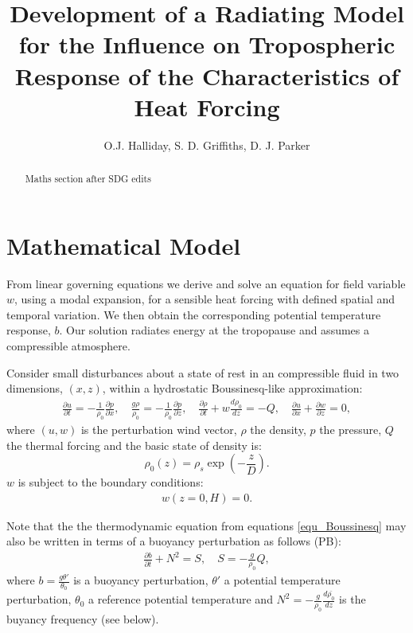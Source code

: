 \documentclass[a4paper,10pt]{article}
\title{Development of a Radiating Model for the Influence on Tropospheric Response of the Characteristics of Heat Forcing }
\author{O.J. Halliday, S. D. Griffiths, D. J. Parker}
\begin{document}
\maketitle
\begin{abstract}
Maths section after SDG edits
\end{abstract}

\section{Mathematical Model}
\label{sec_Model}
%
From linear governing equations we derive and solve an equation for field variable $w$, 
using a modal expansion, for a sensible heat forcing with defined spatial and temporal variation.
We then obtain the corresponding potential temperature response, $b$. 
Our solution radiates energy at the tropopause and assumes a compressible atmosphere.

Consider small disturbances about a state of rest in an compressible fluid in two dimensions, $(x, z)$,
within a hydrostatic Boussinesq-like approximation:
%
\begin{eqnarray}
\label{equ_Boussinesq}
\frac{\partial u}{\partial t}  = - \frac{1}{\rho_0} \frac{\partial p}{\partial x}, \quad
\frac{g \rho}{\rho_0}  =  - \frac{1}{\rho_0}  \frac{\partial p}{\partial z}, \quad
\frac{\partial \rho}{\partial t} +  w \frac{d \rho_0}{dz}  =  -Q, \quad
\frac{\partial u}{\partial x} + \frac{\partial w}{\partial z}  =  0, 
\end{eqnarray}
%
where $(u, w)$ is the perturbation wind vector, $\rho$ the density, $p$ the pressure, $Q$ the thermal forcing and 
the basic state of density is:
%
\begin{equation}
\rho_0 (z) = \rho_s \exp \left( - \frac{z}{D} \right).
\end{equation}
%
$w$ is subject to the boundary conditions:
%
\begin{eqnarray}
\label{bcs}
w(z = 0, H) = 0. 
\end{eqnarray}

Note that the the thermodynamic equation from equations \ref{equ_Boussinesq} may also be written in terms of 
a buoyancy perturbation as follows (PB):
%
\begin{eqnarray}
\label{equ_b}
\frac{\partial b }{\partial t} + N^2 = S, \quad S = - \frac{g }{ \rho_0 } Q,
\end{eqnarray}
%
where $b = \frac{g \theta'}{\theta_0}$ is a buoyancy perturbation, $\theta'$ a potential temperature perturbation, 
$\theta_0$ a reference potential temperature and $N^2 =-\frac{g}{\rho_0}\frac{d \bar{\rho_0}}{dz}$ is the buyancy frequency 
(see below).
\end{document}

